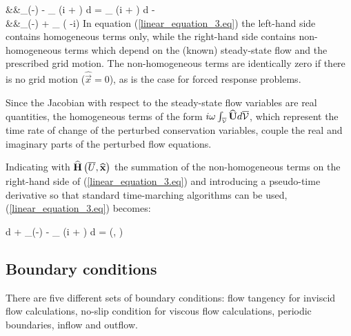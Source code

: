 %
\beq
 &&\oint_{}\left(-\right)
 \cdot {}  -
 \int_{} \left(i\omega {} + \right)
 d =
 \int_{} \left(i\omega {} + \right)
 d - \nonumber \\
 &&\oint_{}\left(-\right) \cdot
 + \oint_{}
  \left(\vec{\Omega}\times{}
                    -i\omega{}\right)
  \cdot {}
 \label{linear_equation_3.eq}
\eeq
%
 In equation (\ref{linear_equation_3.eq}) the left-hand side contains
 homogeneous terms only, while the right-hand side contains non-homogeneous
 terms which depend on the (known) steady-state flow and the prescribed grid
 motion. The non-homogeneous terms are identically zero if there is no grid
 motion ($\widehat{\vec{x}}={0}$), as is the case for  forced response problems.
 
 Since the Jacobian with respect to the steady-state flow variables are real
 quantities, the homogeneous terms of the form $i\omega\int_{\mbox{\tiny $\overline{\cal V}$}} \widehat{\bf U}
 d\overline{\cal V}$, which represent the time rate of change of the perturbed
 conservation variables, couple the real and imaginary parts of the
 perturbed flow equations.

 Indicating with $\widehat{\bf H}\left(\overline{U},\widehat{\bf x}\right)$ the
 summation of the non-homogeneous terms on the right-hand side of (\ref{linear_equation_3.eq})
 and introducing a pseudo-time derivative so that standard time-marching algorithms can be used,
 (\ref{linear_equation_3.eq}) becomes:

%
\beq
 \fpd{}{\tau}\int{}  d +
 \oint_{}\left(-\right)
 \cdot {}  -
 \int_{} \left(i\omega {} + \right)
 d =
 \left(, \right)
 \label{linear_equation_4.eq}
\eeq
%
%
%
\subsection{Boundary conditions}
%
 There are five different sets of boundary conditions: flow tangency for inviscid flow
 calculations, no-slip condition for viscous flow calculations,
 periodic boundaries, inflow and outflow.
%
